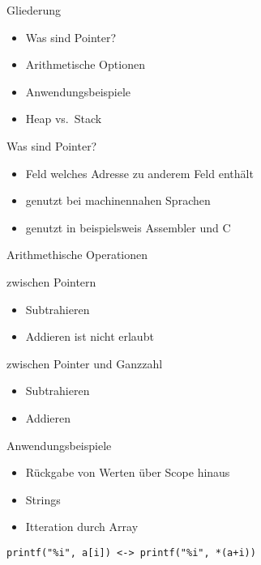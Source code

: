 \begin{frame}{Gliederung}
\protect\hypertarget{gliederung}{}

\begin{itemize}
\tightlist
\item
  Was sind Pointer?
\item
  Arithmetische Optionen
\item
  Anwendungsbeispiele
\item
  Heap vs.~Stack
\end{itemize}

\end{frame}

\begin{frame}{Was sind Pointer?}
\protect\hypertarget{was-sind-pointer}{}

\begin{itemize}
\tightlist
\item
  Feld welches Adresse zu anderem Feld enthält
\item
  genutzt bei machinennahen Sprachen
\item
  genutzt in beispielsweis Assembler und C
\end{itemize}

\end{frame}

\begin{frame}{Arithmethische Operationen}
\protect\hypertarget{arithmethische-operationen}{}

\begin{block}{zwischen Pointern}

\begin{itemize}
\tightlist
\item
  Subtrahieren
\item
  Addieren ist nicht erlaubt
\end{itemize}

\end{block}

\begin{block}{zwischen Pointer und Ganzzahl}

\begin{itemize}
\tightlist
\item
  Subtrahieren
\item
  Addieren
\end{itemize}

\end{block}

\end{frame}

\begin{frame}[fragile]{Anwendungsbeispiele}
\protect\hypertarget{anwendungsbeispiele}{}

\begin{itemize}
\tightlist
\item
  Rückgabe von Werten über Scope hinaus
\item
  Strings
\item
  Itteration durch Array
\end{itemize}

\texttt{printf("\%i",\ a{[}i{]})\ \textless{}-\textgreater{}\ printf("\%i",\ *(a+i))}

\end{frame}
